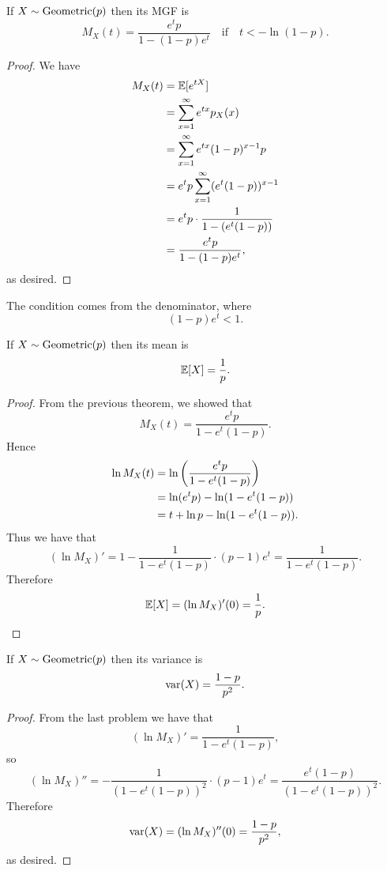 \documentclass[class=article, crop=false]{standalone}
\begin{document}
  \begin{theorem}{}
    If $X\sim \operatorname{Geometric}(p)$ then its MGF is 
    \[
      M_X(t) = \frac{e^tp}{1 - (1 - p)e^t}\quad\text{if}\quad t < -\ln(1 - p).
    \]
    \begin{proof}
      We have
      \begin{align*}
        M_X(t) &= \mathbb{E}[e^{tX}] \\
               &= \sum_{x=1}^{\infty} e^{tx}p_X(x) \\
               &= \sum_{x=1}^{\infty} e^{tx}(1 - p)^{x - 1}p \\
               &= e^tp \sum_{x=1}^{\infty} (e^t(1 - p))^{x - 1} \\
               &= e^tp\cdot \frac{1}{1 - (e^t(1 - p))} \\
               &= \frac{e^tp}{1 - (1 - p)e^t},
      \end{align*}
      as desired.
    \end{proof}
  \end{theorem}
  \begin{note}{}
    The condition comes from the denominator, where
    \[
      (1 - p)e^t < 1.
    \]
  \end{note}
  \begin{theorem}{}
    If $X\sim \operatorname{Geometric}(p)$ then its mean is
    \[
      \mathbb{E}[X] = \frac{1}{p}.
    \]
    \begin{proof}
      From the previous theorem, we showed that
      \[
        M_X(t) = \frac{e^tp}{1 - e^t(1 - p)}.
      \]
      Hence
      \begin{align*}
        \ln M_X(t) &= \ln \left( \frac{e^tp}{1 - e^t(1 - p)} \right) \\
                   &= \ln (e^tp) - \ln(1 - e^t(1 - p)) \\
                   &= t + \ln p - \ln (1 - e^t(1 - p)).
      \end{align*}
      Thus we have that
      \[
        (\ln M_X)' = 1 - \frac{1}{1 - e^t(1 - p)}\cdot (p - 1)e^t = \frac{1}{1 - e^t(1 - p)}.
      \]
      Therefore
      \[
        \mathbb{E}[X] = (\ln M_X)'(0) = \frac{1}{p}.
      \]
    \end{proof}
  \end{theorem}
  \begin{theorem}{}
    If $X\sim \operatorname{Geometric}(p)$ then its variance is
    \[
      \operatorname{var}(X) = \frac{1 - p}{p^2}.
    \]
    \begin{proof}
      From the last problem we have that
      \[
        (\ln M_X)' = \frac{1}{1 - e^t(1 - p)},
      \]
      so
      \[
        (\ln M_X)'' = -\frac{1}{(1 - e^t(1 - p))^2}\cdot (p - 1)e^t = \frac{e^t(1 - p)}{(1 - e^t(1 - p))^2}.
      \]
      Therefore
      \[
        \operatorname{var}(X) = (\ln M_X)''(0) = \frac{1 - p}{p^2},
      \]
      as desired.
    \end{proof}
  \end{theorem}
\end{document}
